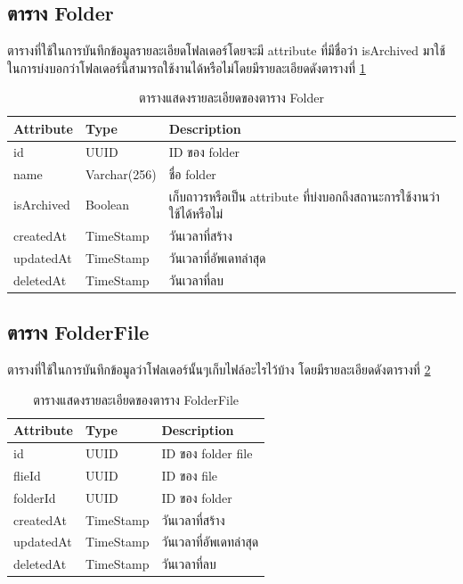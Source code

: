\documentclass[12pt,oneside,openright,a4paper]{cpe-thai-project}
\begin{document}
\newpage
\subsection{ตาราง Folder}
ตารางที่ใช้ในการบันทึกข้อมูลรายละเอียดโฟลเดอร์โดยจะมี attribute ที่มีชื่อว่า isArchived มาใช้ในการบ่งบอกว่าโฟลเดอร์นี้สามารถใช้งานได้หรือไม่โดยมีรายละเอียดดังตารางที่ \ref{tbl:dbFolder}
\begin{table}[!ht]
    \centering
    \begin{tabular}{|p{4cm}|p{2cm}|p{6cm}|}
    \hline
    \textbf{Attribute} & \textbf{Type} & \textbf{Description}   \\ \hline
    id        & UUID        & ID ของ folder          \\ \hline
    name      & Varchar(256) & ชื่อ folder            \\ \hline
    isArchived         & Boolean          & เก็บถาวรหรือเป็น attribute ที่บ่งบอกถึงสถานะการใช้งานว่าใช้ได้หรือไม่ \\ \hline
    createdAt & TimeStamp   & วันเวลาที่สร้าง        \\ \hline
    updatedAt & TimeStamp   & วันเวลาที่อัพเดทล่าสุด \\ \hline
    deletedAt & TimeStamp   & วันเวลาที่ลบ             \\ \hline
    \end{tabular}
    \caption{\centering  ตารางแสดงรายละเอียดของตาราง Folder} \label{tbl:dbFolder}
\end{table}

\subsection{ตาราง FolderFile}
ตารางที่ใช้ในการบันทึกข้อมูลว่าโฟลเดอร์นั้นๆเก็บไฟล์อะไรไว้บ้าง โดยมีรายละเอียดดังตารางที่  \ref{tbl:dbFolderFile}
\begin{table}[!ht]
    \centering
    \begin{tabular}{|p{4cm}|p{2cm}|p{6cm}|}
    \hline
    \textbf{Attribute} & \textbf{Type} & \textbf{Description}   \\ \hline
    id        & UUID      & ID ของ folder file     \\ \hline
    flieId    & UUID      & ID ของ file            \\ \hline
    folderId  & UUID      & ID ของ folder          \\ \hline
    createdAt & TimeStamp & วันเวลาที่สร้าง        \\ \hline
    updatedAt & TimeStamp & วันเวลาที่อัพเดทล่าสุด \\ \hline
    deletedAt & TimeStamp & วันเวลาที่ลบ              \\ \hline
    \end{tabular}
    \caption{\centering  ตารางแสดงรายละเอียดของตาราง FolderFile} \label{tbl:dbFolderFile}
\end{table}
\end{document}

